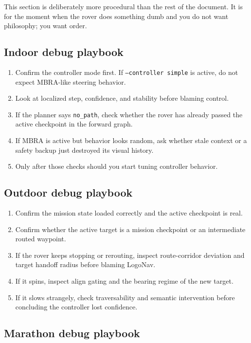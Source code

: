 \documentclass[11pt]{article}
\begin{document}
This section is deliberately more procedural than the rest of the document. It is
for the moment when the rover does something dumb and you do not want philosophy;
you want order.

\subsection{Indoor debug playbook}

\begin{enumerate}[nosep]
  \item Confirm the controller mode first. If \texttt{--controller simple} is active,
  do not expect MBRA-like steering behavior.
  \item Look at localized step, confidence, and stability before blaming control.
  \item If the planner says \texttt{no\_path}, check whether the rover has already
  passed the active checkpoint in the forward graph.
  \item If MBRA is active but behavior looks random, ask whether stale context or a
  safety backup just destroyed its visual history.
  \item Only after those checks should you start tuning controller behavior.
\end{enumerate}

\subsection{Outdoor debug playbook}

\begin{enumerate}[nosep]
  \item Confirm the mission state loaded correctly and the active checkpoint is real.
  \item Confirm whether the active target is a mission checkpoint or an intermediate
  routed waypoint.
  \item If the rover keeps stopping or rerouting, inspect route-corridor deviation
  and target handoff radius before blaming LogoNav.
  \item If it spins, inspect align gating and the bearing regime of the new target.
  \item If it slows strangely, check traversability and semantic intervention before
  concluding the controller lost confidence.
\end{enumerate}

\subsection{Marathon debug playbook}
\end{document}

